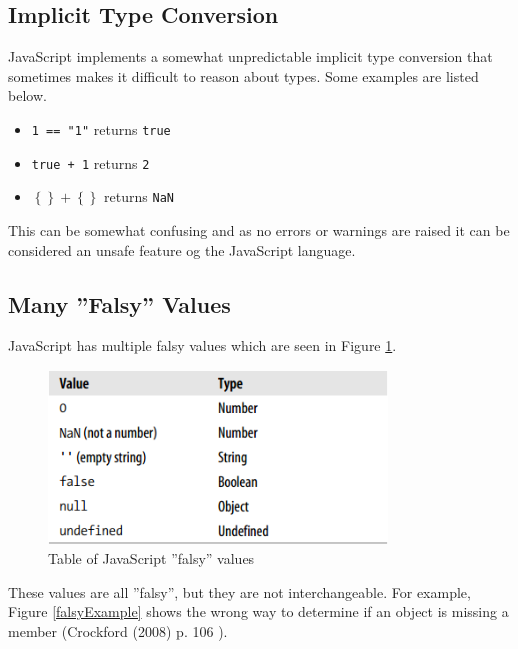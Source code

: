 	\subsection{Implicit Type Conversion} %
	\label{sub:implicit_type_conversion}
		JavaScript implements a somewhat unpredictable implicit type conversion that sometimes makes it difficult to reason about types. Some examples are listed below.

		\begin{itemize}
			\item \texttt{1 == "1"} returns \texttt{true}
			\item \texttt{true + 1} returns \texttt{2}
			\item \texttt{$\left\{\right\} + \left\{\right\}$} returns \texttt{NaN}
		\end{itemize}

		This can be somewhat confusing and as no errors or warnings are raised it can be considered an unsafe feature og the JavaScript language. 

	\subsection{Many ''Falsy'' Values} %
	\label{sub:many_falsy_values}
		JavaScript has multiple falsy values which are seen in Figure \ref{falsyValues}.

			\begin{figure}[H]
				\begin{center}
					\centerline{\includegraphics[width=9cm]{resources/images/FalsyValues.png}}
				\end{center}
				\caption{Table of JavaScript ''falsy'' values \cite{good_parts}}
				\label{falsyValues}
			\end{figure}

		These values are all ''falsy'', but they are not interchangeable. For example, Figure \ref{falsyExample} shows the wrong way to determine if an object is missing a member (Crockford (2008) p. 106 \cite{good_parts}).

